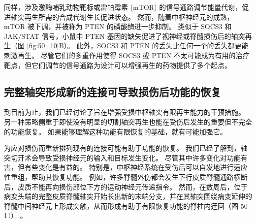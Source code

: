 同样，涉及激酶哺乳动物靶标或雷帕霉素 (mTOR) 的信号通路调节能量代谢，促进轴突再生所需的合成代谢生长促进状态。 然而，随着中枢神经元的成熟，mTOR 被下调，并被称为 PTEN 的磷酸酶进一步抑制。 类似于 SOCS3 和 JAK/STAT 信号，小鼠中 PTEN 基因的缺失促进了视神经或脊髓损伤后的轴突再生（图 \ref{fig:50_10}B）。 此外，SOCS3 和 PTEN 的丢失比任何一个的丢失都更能刺激再生。 尽管它们的多重作用使得 SOCS3 或 PTEN 不太可能成为有用的治疗靶点，但它们调节的信号通路为设计可以增强再生的药物提供了多个起点。

\subsection{完整轴突形成新的连接可导致损伤后功能的恢复}

到目前为止，我们已经讨论了旨在增强受损中枢轴突有限再生能力的干预措施。 另一种策略侧重于即使没有明显的切割轴突再生也能在受伤后发生的重要但不完全的功能恢复。 如果能够理解这种功能有限恢复的基础，就有可能加强它。

为应对损伤而重新排列现有的连接可能有助于功能的恢复。 我们已经了解到，轴突切开术会导致受损神经元的输入和目标发生变化。 尽管其中许多变化对功能有害，但有些变化是有益的。 特别是，中枢神经系统在受伤后可以自发地进行适应性重组，帮助其恢复功能。 例如，许多脊髓外伤都会发生下行皮质脊髓通路横断后，皮质不能再向损伤部位下方的运动神经元传递指令。 然而，在数周后，位于病变头端的完整皮质脊髓轴突开始长出新的末端分支，并在其轴突围绕病变延伸的脊髓中间神经元上形成突触，从而形成有助于有限恢复功能的脊柱内迂回（图 50-11） 。



